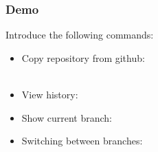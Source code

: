 \begin{frame}
  \frametitle{Demo}
  
  Introduce the following commands:
  \begin{itemize}
  \item 
    Copy repository from github:\\
    \\\hfill
  \item View history:\\
  \item Show current branch:\\
  \item Switching between branches:\\
    \\
  \end{itemize}
\end{frame}



